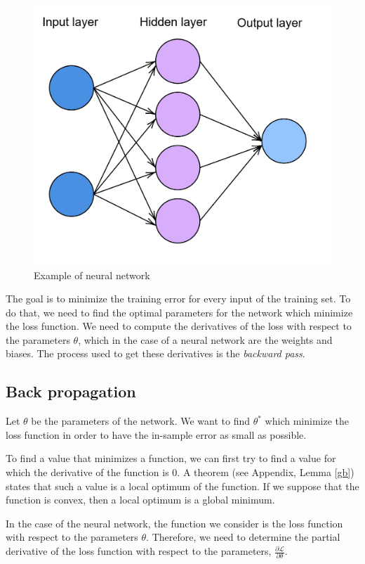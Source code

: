 \documentclass[10pt,a4paper]{article}
\theoremstyle{definition}
\theoremstyle{plain}
\begin{document}
\begin{figure}
\center
\includegraphics[scale=0.2]{nn.png}
\caption{Example of neural network}
\label{examplenn}
\end{figure}

The goal is to minimize the training error for every input of the training set. To do that, we need to find the optimal parameters for the network which minimize the loss function. We need to compute the derivatives of the loss with respect to the parameters $\theta$, which in the case of a neural network are the weights and biases. The process used to get these derivatives is the \textit{backward pass}.


\subsection{Back propagation}\label{ode}
Let $\theta$ be the parameters of the network. We want to find $\theta^*$ which minimize the loss function in order to have the in-sample error as small as possible.

To find a value that minimizes a function, we can first try to find a value for which the derivative of the function is $0$. A theorem (see Appendix, Lemma \ref{gb}) states that such a value is a local optimum of the function. If we suppose that the function is convex, then a local optimum is a global minimum.

In the case of the neural network, the function we consider is the loss function with respect to the parameters $\theta$.
Therefore, we need to determine the partial derivative of the loss function with respect to the parameters, $\frac{\partial \mathcal{L}}{\partial \theta}$.
\end{document}
